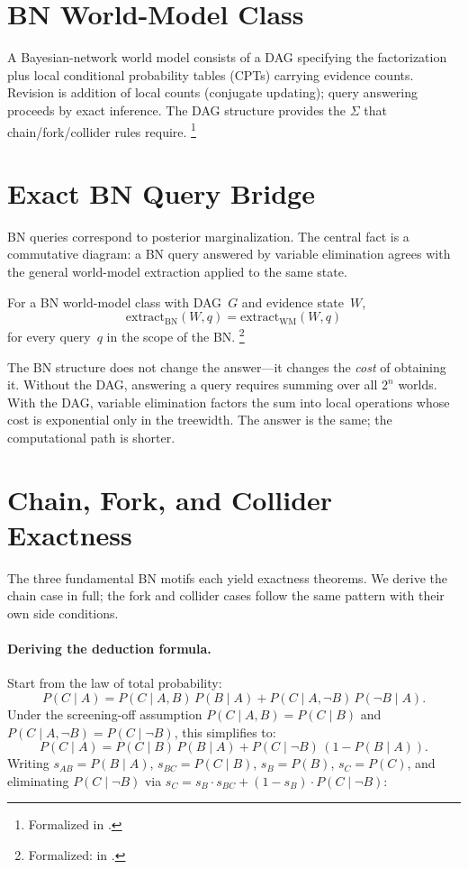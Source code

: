 \documentclass[11pt,openany]{report}
\begin{document}
\section{BN World-Model Class}

A Bayesian-network world model consists of a DAG specifying the
factorization plus local conditional probability tables (CPTs) carrying
evidence counts.  Revision is addition of local counts (conjugate
updating); query answering proceeds by exact inference.  The DAG
structure provides the $\Sigma$ that chain/fork/collider rules
require.%
\footnote{Formalized in
.}


\section{Exact BN Query Bridge}

BN queries correspond to posterior marginalization.  The central
fact is a commutative diagram: a BN query answered by variable
elimination agrees with the general world-model extraction applied
to the same state.

\begin{theorem}
For a BN world-model class with DAG~$G$ and evidence state~$W$,
\[
  \mathrm{extract}_{\mathrm{BN}}(W, q) = \mathrm{extract}_{\mathrm{WM}}(W, q)
\]
for every query~$q$ in the scope of the BN.%
\footnote{Formalized:
 in
.}
\end{theorem}

\noindent
The BN structure does not change the answer---it changes the
\emph{cost} of obtaining it.  Without the DAG, answering a query
requires summing over all $2^n$ worlds.  With the DAG, variable
elimination factors the sum into local operations whose cost is
exponential only in the treewidth.  The answer is the same;
the computational path is shorter.


\section{Chain, Fork, and Collider Exactness}

The three fundamental BN motifs each yield exactness theorems.
We derive the chain case in full; the fork and collider cases
follow the same pattern with their own side conditions.

\paragraph{Deriving the deduction formula.}
Start from the law of total probability:
\[
  P(C \mid A) = P(C \mid A, B)\,P(B \mid A)
              + P(C \mid A, \neg B)\,P(\neg B \mid A).
\]
Under the screening-off assumption $P(C \mid A, B) = P(C \mid B)$
and $P(C \mid A, \neg B) = P(C \mid \neg B)$, this simplifies to:
\[
  P(C \mid A) = P(C \mid B)\,P(B \mid A)
              + P(C \mid \neg B)\,(1 - P(B \mid A)).
\]
Writing $s_{AB} = P(B \mid A)$, $s_{BC} = P(C \mid B)$,
$s_B = P(B)$, $s_C = P(C)$, and eliminating $P(C \mid \neg B)$
via $s_C = s_B \cdot s_{BC} + (1 - s_B) \cdot P(C \mid \neg B)$:
\end{document}
